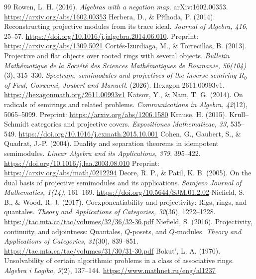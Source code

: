 \documentclass[11pt]{amsart}
\theoremstyle{definition}
\theoremstyle{remark}
\begin{document}
\begin{thebibliography}{99}
 Rowen, L. H. (2016). \emph{Algebras with a negation map}. arXiv:1602.00353. \url{https://arxiv.org/abs/1602.00353}
 Herbera, D., \& P\v r\'ihoda, P. (2014). Reconstructing projective modules from its trace ideal. \emph{Journal of Algebra, 416}, 25--57. \url{https://doi.org/10.1016/j.jalgebra.2014.06.010}. Preprint: \url{https://arxiv.org/abs/1309.5021}
 Cort\'es-Izurdiaga, M., \& Torrecillas, B. (2013). Projective and flat objects over rooted rings with several objects. \emph{Bulletin Math\'ematique de la Soci\'et\'e des Sciences Math\'ematiques de Roumanie, 56(104)}(3), 315--330.
 \emph{Spectrum, semimodules and projectives of the inverse semiring $R_0$ of Faul, Goswami, Joubert and Manuell}. (2026). Hexagon 2611.00993v1. \url{https://hexagonmath.org/2611.00993v1}
 Katsov, Y., \& Nam, T. G. (2014). On radicals of semirings and related problems. \emph{Communications in Algebra, 42}(12), 5065--5099. Preprint: \url{https://arxiv.org/abs/1206.1580}
 Krause, H. (2015). Krull--Schmidt categories and projective covers. \emph{Expositiones Mathematicae, 33}, 535--549. \url{https://doi.org/10.1016/j.exmath.2015.10.001}
 Cohen, G., Gaubert, S., \& Quadrat, J.-P. (2004). Duality and separation theorems in idempotent semimodules. \emph{Linear Algebra and its Applications, 379}, 395--422. \url{https://doi.org/10.1016/j.laa.2003.08.010} Preprint: \url{https://arxiv.org/abs/math/0212294}
 Deore, R. P., \& Patil, K. B. (2005). On the dual basis of projective semimodules and its applications. \emph{Sarajevo Journal of Mathematics, 1(14)}, 161--169. \url{https://doi.org/10.5644/SJM.01.2.02}
 Niefield, S. B., \& Wood, R. J. (2017). Coexponentiability and projectivity: Rigs, rings, and quantales. \emph{Theory and Applications of Categories, 32}(36), 1222--1228. \url{https://tac.mta.ca/tac/volumes/32/36/32-36.pdf}
 Niefield, S. (2016). Projectivity, continuity, and adjointness: Quantales, $Q$-posets, and $Q$-modules. \emph{Theory and Applications of Categories, 31}(30), 839--851. \url{https://tac.mta.ca/tac/volumes/31/30/31-30.pdf}
 Bokut', L. A. (1970). Unsolvability of certain algorithmic problems in a class of associative rings. \emph{Algebra i Logika, 9}(2), 137--144. \url{https://www.mathnet.ru/eng/al1237}
\end{thebibliography}
\end{document}
